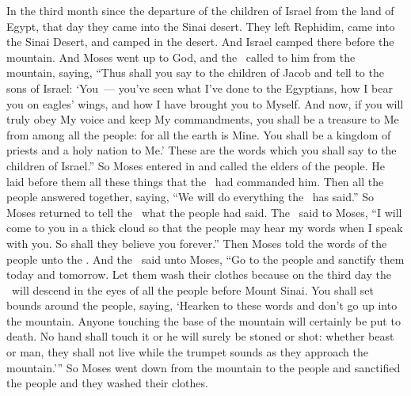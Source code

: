 
\begin{inparaenum}
   In the third month since the departure of the children of Israel from the land of Egypt, that day they came into the Sinai desert.%
   They left Rephidim, came into the Sinai Desert, and camped in the desert. And Israel camped there before the mountain.%
   And Moses went up to God, and the \lord\ called to him from the mountain, saying, ``Thus shall you say to the children of Jacob and tell to the sons of Israel:%
   `You~--- you've seen what I've done to the Egyptians, how I bear you on eagles' wings, and how I have brought you to Myself.%
   And now, if you will truly obey My voice and keep My commandments, you shall be a treasure to Me from among all the people: for all the earth is Mine.%
   You shall be a kingdom of priests and a holy nation to Me.' These are the words which you shall say to the children of Israel.''%
   So Moses entered in and called the elders of the people. He laid before them all these things that the \lord\ had commanded him.%
   Then all the people answered together, saying, ``We will do everything the \lord\ has said.'' So Moses returned to tell the \lord\ what the people had said.%
   The \lord\ said to Moses, ``I will come to you in a thick cloud so that the people may hear my words when I speak with you. So shall they believe you forever.'' Then Moses told the words of the people unto the \lord.%
   And the \lord\ said unto Moses, ``Go to the people and sanctify them today and tomorrow. Let them wash their clothes%
   because on the third day the \lord\ will descend in the eyes of all the people before Mount Sinai.%
   You shall set bounds around the people, saying, `Hearken to these words and don't go up into the mountain. Anyone touching the base of the mountain will certainly be put to death.%
   No hand shall touch it or he will surely be stoned or shot: whether beast or man, they shall not live while the trumpet sounds as they approach the mountain.'\thinspace''%
   So Moses went down from the mountain to the people and sanctified the people and they washed their clothes.%

\end{inparaenum}
